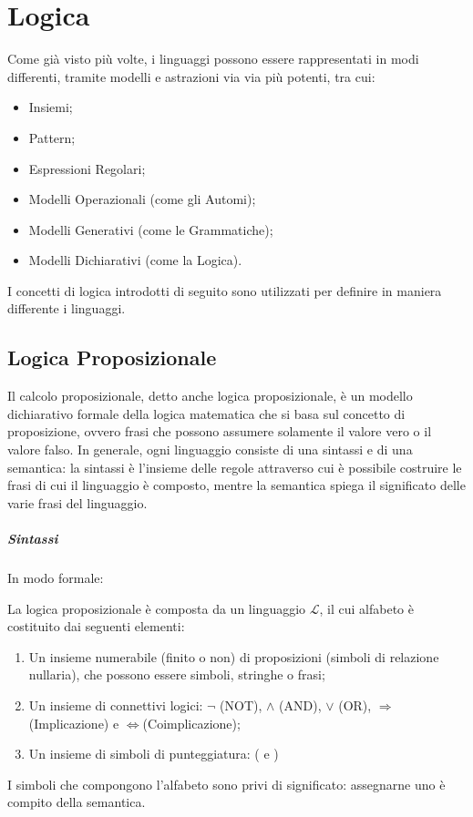 \chapter{Logica}
Come già visto più volte, i linguaggi possono essere rappresentati in modi differenti, tramite modelli e astrazioni via via più potenti, tra cui:
\begin{itemize}
  \item Insiemi;
  \item Pattern;
  \item Espressioni Regolari;
  \item Modelli Operazionali (come gli Automi);
  \item Modelli Generativi (come le Grammatiche);
  \item Modelli Dichiarativi (come la Logica).
\end{itemize}

\noindent
I concetti di logica introdotti di seguito sono utilizzati per definire in maniera differente i linguaggi.

\section{Logica Proposizionale}
Il calcolo proposizionale, detto anche logica proposizionale, è un modello dichiarativo formale della logica matematica che si basa sul concetto di proposizione, ovvero frasi che possono assumere solamente il valore vero o il valore falso. In generale, ogni linguaggio consiste di una sintassi e di una semantica: la sintassi è l'insieme delle regole attraverso cui è possibile costruire le frasi di cui il linguaggio è composto, mentre la semantica spiega il significato delle varie frasi del linguaggio. 

\paragraph*{Sintassi}
In modo formale:
\begin{definition}
  La logica proposizionale è composta da un linguaggio \(\mathcal L\), il cui alfabeto è costituito dai seguenti elementi:
  \begin{enumerate}
    \item Un insieme numerabile (finito o non) di proposizioni (simboli di relazione nullaria), che possono essere simboli, stringhe o frasi;
    \item Un insieme di connettivi logici: \(\lnot\) (NOT), \(\wedge\) (AND), \(\vee\) (OR), \(\Rightarrow\) (Implicazione) e \(\Leftrightarrow \)(Coimplicazione);
    \item Un insieme di simboli di punteggiatura: ( e )
  \end{enumerate}
  I simboli che compongono l'alfabeto sono privi di significato: assegnarne uno è compito della semantica. 
\end{definition}

